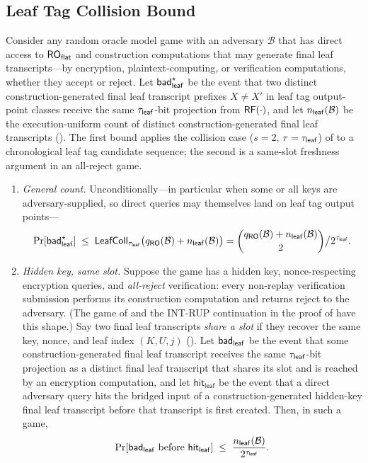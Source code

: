 \subsection{Leaf Tag Collision Bound}
\label{app:lem-leaf-collision}

\begin{lemma}
\label{lem:leaf-collision}
Consider any \TW{} random oracle model game with an adversary
$\mathcal{B}$ that has direct access to $\mathsf{RO}_{\mathsf{flat}}$ and construction
computations that may generate final leaf transcripts---by encryption,
plaintext-computing, or verification computations, whether they accept or
reject. Let
$\mathsf{bad}_{\mathsf{leaf}}^\star$ be the event that two distinct construction-generated final
leaf transcript prefixes $X \neq X'$ in leaf tag output-point classes
receive the same $\tau_{\mathsf{leaf}}$-bit projection from $\mathsf{RF}(\cdot)$, and let
$n_{\mathsf{leaf}}(\mathcal{B})$ be the execution-uniform count of distinct
construction-generated final leaf transcripts ().
The first bound applies the collision case ($s = 2$, $\tau = \tau_{\mathsf{leaf}}$)
of  to a chronological leaf tag candidate
sequence; the second is a same-slot freshness argument in an all-reject
game.
\begin{enumerate}
\item \emph{General count.} Unconditionally---in particular when some
  or all keys are adversary-supplied, so direct queries may themselves
  land on leaf tag output points---
  \[
    \Pr[\mathsf{bad}_{\mathsf{leaf}}^\star] \;\leq\;
    \mathsf{LeafColl}_{\tau_{\mathsf{leaf}}}\bigl(q_{\mathsf{RO}}(\mathcal{B})+n_{\mathsf{leaf}}(\mathcal{B})\bigr)
    = \binom{q_{\mathsf{RO}}(\mathcal{B})+n_{\mathsf{leaf}}(\mathcal{B})}{2} \big/ 2^{\tau_{\mathsf{leaf}}}.
  \]
\item \emph{Hidden key, same slot.} Suppose the game has a hidden key,
  nonce-respecting encryption queries, and \emph{all-reject}
  verification: every non-replay verification submission performs its
  construction computation and returns reject to the adversary. (The
  game \Grej{} of  and the
  \textsf{INT-RUP} continuation in the proof of
   have this shape.) Say two final
  leaf transcripts \emph{share a slot} if they recover the same key,
  nonce, and leaf index $(K, U, j)$ (). Let
  $\mathsf{bad}_{\mathsf{leaf}}$ be the event that some construction-generated final leaf
  transcript receives the same $\tau_{\mathsf{leaf}}$-bit projection as a distinct
  final leaf transcript that shares its slot and is reached by an
  encryption computation, and let $\mathsf{hit}_{\mathsf{leaf}}$ be the
  event that a direct adversary query hits the bridged input of a
  construction-generated hidden-key final leaf transcript before that
  transcript is first created. Then, in such a game,
  \[
    \Pr[\mathsf{bad}_{\mathsf{leaf}} \text{ before } \mathsf{hit}_{\mathsf{leaf}}]
    \;\leq\; \frac{n_{\mathsf{leaf}}(\mathcal{B})}{2^{\tau_{\mathsf{leaf}}}}.
  \]
\end{enumerate}
\end{lemma}

